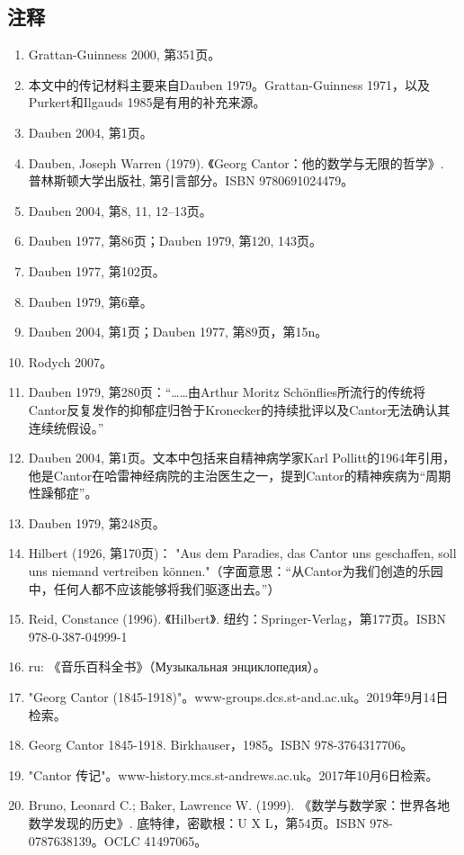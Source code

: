 \subsection{注释}
\begin{enumerate}
\item Grattan-Guinness 2000, 第351页。
\item 本文中的传记材料主要来自Dauben 1979。Grattan-Guinness 1971，以及Purkert和Ilgauds 1985是有用的补充来源。
\item Dauben 2004, 第1页。
\item Dauben, Joseph Warren (1979). 《Georg Cantor：他的数学与无限的哲学》. 普林斯顿大学出版社, 第引言部分。ISBN 9780691024479。
\item Dauben 2004, 第8, 11, 12–13页。
\item Dauben 1977, 第86页；Dauben 1979, 第120, 143页。
\item Dauben 1977, 第102页。
\item Dauben 1979, 第6章。
\item Dauben 2004, 第1页；Dauben 1977, 第89页，第15n。
\item Rodych 2007。
\item Dauben 1979, 第280页：“……由Arthur Moritz Schönflies所流行的传统将Cantor反复发作的抑郁症归咎于Kronecker的持续批评以及Cantor无法确认其连续统假设。”
\item Dauben 2004, 第1页。文本中包括来自精神病学家Karl Pollitt的1964年引用，他是Cantor在哈雷神经病院的主治医生之一，提到Cantor的精神疾病为“周期性躁郁症”。
\item Dauben 1979, 第248页。
\item Hilbert (1926, 第170页)： "Aus dem Paradies, das Cantor uns geschaffen, soll uns niemand vertreiben können."（字面意思：“从Cantor为我们创造的乐园中，任何人都不应该能够将我们驱逐出去。”）
\item Reid, Constance (1996). 《Hilbert》. 纽约：Springer-Verlag，第177页。ISBN 978-0-387-04999-1
\item ru: 《音乐百科全书》（Музыкальная энциклопедия）。
\item "Georg Cantor (1845-1918)"。www-groups.dcs.st-and.ac.uk。2019年9月14日检索。
\item Georg Cantor 1845-1918. Birkhauser，1985。ISBN 978-3764317706。
\item "Cantor 传记"。www-history.mcs.st-andrews.ac.uk。2017年10月6日检索。
\item Bruno, Leonard C.; Baker, Lawrence W. (1999). 《数学与数学家：世界各地数学发现的历史》. 底特律，密歇根：U X L，第54页。ISBN 978-0787638139。OCLC 41497065。

\end{enumerate}
